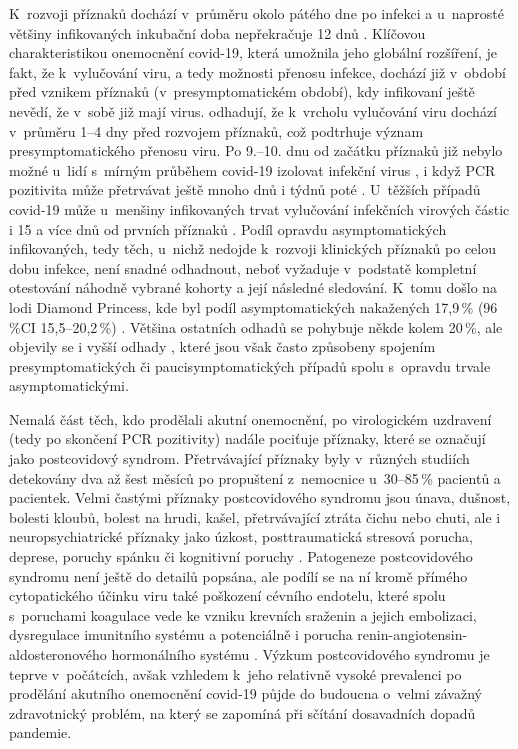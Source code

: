 K~rozvoji příznaků dochází v~průměru okolo pátého dne po infekci \cite{Zhang:2020,Xie:2020} a u~naprosté většiny infikovaných inkubační doba nepřekračuje 12 dnů \cite{Wiersinga:2020}. Klíčovou charakteristikou onemocnění covid-19, která umožnila jeho globální rozšíření, je fakt, že k~vylučování viru, a tedy možnosti přenosu infekce, dochází již v~období před vznikem příznaků (v~presymptomatickém období), kdy infikovaní ještě nevědí, že v~sobě již mají virus. \cite{Jones:2021} odhadují, že k~vrcholu vylučování viru dochází v~průměru 1--4 dny před rozvojem příznaků, což podtrhuje význam presymptomatického přenosu viru. Po 9.--10. dnu od začátku příznaků již nebylo možné u~lidí s~mírným průběhem covid-19 izolovat infekční virus \cite{wolfel2020virological,Jones:2021}, 
i když PCR pozitivita může přetrvávat ještě mnoho dnů i týdnů poté \cite{Byrne:2020}. U~těžších případů covid-19 může u~menšiny infikovaných trvat vylučování infekčních virových částic i 15 a více dnů od prvních příznaků \cite{Kampen:2021}. Podíl opravdu asymptomatických infikovaných, tedy těch, u~nichž nedojde k~rozvoji klinických příznaků po celou dobu infekce, není snadné odhadnout, neboť vyžaduje v~podstatě kompletní otestování náhodně vybrané kohorty a její následné sledování. K~tomu došlo na lodi Diamond Princess, kde byl podíl asymptomatických nakažených 17,9\,\% (96\,\%CI 15,5--20,2\,\%) \cite{Mizumoto:2020}. Většina ostatních odhadů se pohybuje někde kolem 20\,\%, ale objevily se i vyšší odhady \cite{Yanes-Lane:2020}, které jsou však často způsobeny spojením presymptomatických či paucisymptomatických případů spolu s~opravdu trvale asymptomatickými.

Nemalá část těch, kdo prodělali akutní onemocnění, po virologickém uzdravení (tedy po skončení PCR pozitivity) nadále pociťuje příznaky, které se označují jako postcovidový syndrom. Přetrvávající příznaky byly v~různých studiích detekovány dva až šest měsíců po propuštení z~nemocnice u~30--85\,\% pacientů a pacientek. Velmi častými příznaky postcovidového syndromu jsou únava, dušnost, bolesti kloubů, bolest na hrudi, kašel, přetrvávající ztráta čichu nebo chuti, ale i neuropsychiatrické příznaky jako úzkost, posttraumatická stresová porucha, deprese, poruchy spánku či kognitivní poruchy \cite{Nalbandian:2021}. Patogeneze postcovidového syndromu není ještě do detailů popsána, ale podílí se na ní kromě přímého cytopatického účinku viru také poškození cévního endotelu, které spolu s~poruchami koagulace vede ke vzniku krevních sraženin a jejich embolizaci, dysregulace imunitního systému a potenciálně i porucha renin-angiotensin-aldosteronového hormonálního systému \cite{Gupta:2020}. Výzkum postcovidového syndromu je teprve v~počátcích, avšak vzhledem k~jeho relativně vysoké prevalenci po prodělání akutního onemocnění covid-19 půjde do budoucna o~velmi závažný zdravotnický problém, na který se zapomíná při sčítání dosavadních dopadů pandemie.

